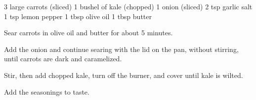 \dishtype{\side}
\dishother{\vegetarian}
\begin{ingreds}
    3 large carrots (sliced)
    1 bushel of kale (chopped)
    1 onion (sliced)
    2 tsp garlic salt
    1 tsp lemon pepper
    1 tbsp olive oil
    1 tbsp butter    
\end{ingreds}
\begin{method}
    Sear carrots in olive oil and butter for about 5 minutes.\par
    Add the onion and continue searing with the lid on the pan, without stirring, until carrots are dark and caramelized.\par
    Stir, then add chopped kale, turn off the burner, and cover until kale is wilted.\par
    Add the seasonings to taste.
\end{method}